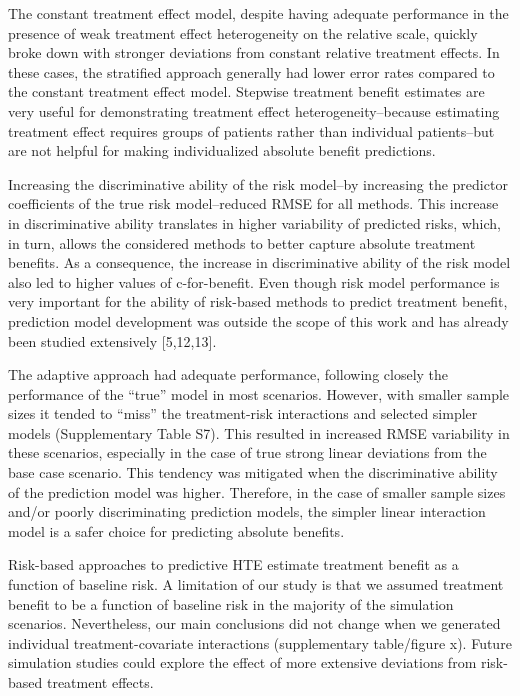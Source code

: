 \documentclass{article}
\begin{document}
The constant treatment effect model, despite having adequate performance
in the presence of weak treatment effect heterogeneity on the relative
scale, quickly broke down with stronger deviations from constant
relative treatment effects. In these cases, the stratified approach
generally had lower error rates compared to the constant treatment
effect model. Stepwise treatment benefit estimates are very useful for
demonstrating treatment effect heterogeneity--because estimating
treatment effect requires groups of patients rather than individual
patients--but are not helpful for making individualized absolute benefit
predictions.

Increasing the discriminative ability of the risk model--by increasing
the predictor coefficients of the true risk model--reduced RMSE for all
methods. This increase in discriminative ability translates in higher
variability of predicted risks, which, in turn, allows the considered
methods to better capture absolute treatment benefits. As a consequence,
the increase in discriminative ability of the risk model also led to
higher values of c-for-benefit. Even though risk model performance is
very important for the ability of risk-based methods to predict
treatment benefit, prediction model development was outside the scope of
this work and has already been studied extensively {[}5,12,13{]}.

The adaptive approach had adequate performance, following closely the
performance of the ``true'' model in most scenarios. However, with
smaller sample sizes it tended to ``miss'' the treatment-risk
interactions and selected simpler models (Supplementary Table S7). This
resulted in increased RMSE variability in these scenarios, especially in
the case of true strong linear deviations from the base case scenario.
This tendency was mitigated when the discriminative ability of the
prediction model was higher. Therefore, in the case of smaller sample
sizes and/or poorly discriminating prediction models, the simpler linear
interaction model is a safer choice for predicting absolute benefits.

Risk-based approaches to predictive HTE estimate treatment benefit as a
function of baseline risk. A limitation of our study is that we assumed
treatment benefit to be a function of baseline risk in the majority of
the simulation scenarios. Nevertheless, our main conclusions did not
change when we generated individual treatment-covariate interactions
(supplementary table/figure x). Future simulation studies could explore
the effect of more extensive deviations from risk-based treatment
effects.
\end{document}
